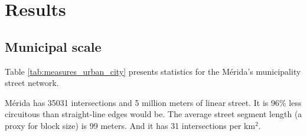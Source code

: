 \chapter{Results}
\label{cha:chapter4}

\section{Municipal scale}

Table \ref{tab:measures_urban_city} presents statistics for the Mérida's municipality street network. 

Mérida has 35031 intersections and 5 million meters of linear street. It is 96\% less circuitous than straight-line edges would be. The average street segment length (a proxy for block size) is 99 meters. And it has 31 intersections per km$^2$.

